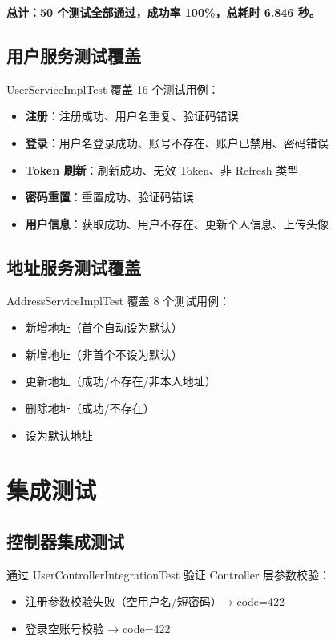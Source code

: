 \documentclass[12pt,a4paper,UTF8]{ctexart}
\begin{document}
\textbf{总计：50 个测试全部通过，成功率 100\%，总耗时 6.846 秒。}

\subsection{用户服务测试覆盖}

UserServiceImplTest 覆盖 16 个测试用例：

\begin{itemize}
    \item \textbf{注册}：注册成功、用户名重复、验证码错误
    \item \textbf{登录}：用户名登录成功、账号不存在、账户已禁用、密码错误
    \item \textbf{Token 刷新}：刷新成功、无效 Token、非 Refresh 类型
    \item \textbf{密码重置}：重置成功、验证码错误
    \item \textbf{用户信息}：获取成功、用户不存在、更新个人信息、上传头像
\end{itemize}

\subsection{地址服务测试覆盖}

AddressServiceImplTest 覆盖 8 个测试用例：

\begin{itemize}
    \item 新增地址（首个自动设为默认）
    \item 新增地址（非首个不设为默认）
    \item 更新地址（成功/不存在/非本人地址）
    \item 删除地址（成功/不存在）
    \item 设为默认地址
\end{itemize}

\section{集成测试}

\subsection{控制器集成测试}

通过 UserControllerIntegrationTest 验证 Controller 层参数校验：

\begin{itemize}
    \item 注册参数校验失败（空用户名/短密码）→ code=422
    \item 登录空账号校验 → code=422
\end{itemize}
\end{document}
